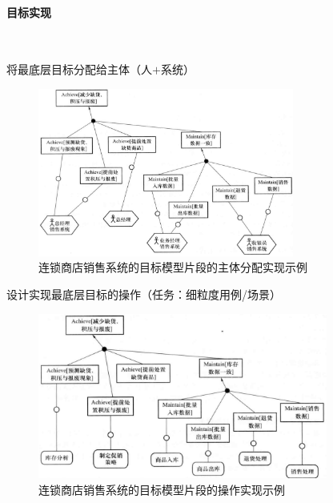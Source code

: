 \paragraph{目标实现}~{} \par
将最底层目标分配给主体（人$+$系统）
\begin{figure}[H]
	\centering
	\includegraphics[width=0.75\textwidth]{img/连锁商店销售系统的目标模型片段的主体分配实现示例.png}
    \caption*{连锁商店销售系统的目标模型片段的主体分配实现示例}
\end{figure}
\vspace{-1em}

设计实现最底层目标的操作（任务：细粒度用例/场景）
\begin{figure}[H]
	\centering
	\includegraphics[width=0.85\textwidth]{img/连锁商店销售系统的目标模型片段的操作实现示例.png}
    \caption*{连锁商店销售系统的目标模型片段的操作实现示例}
\end{figure}
\vspace{-1em}